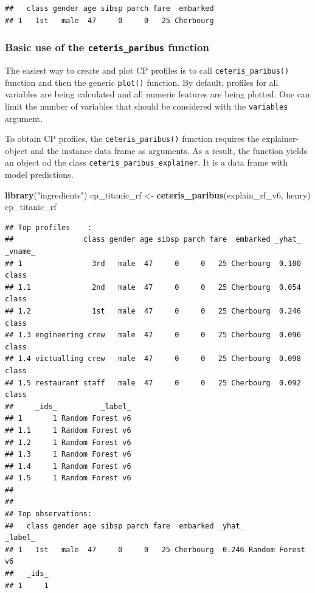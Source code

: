 \documentclass[12pt,]{krantz}
\newenvironment{Shaded}{\begin{snugshade}}{\end{snugshade}}
\newcommand{\KeywordTok}[1]{\textcolor[rgb]{0.13,0.29,0.53}{\textbf{#1}}}
\newcommand{\NormalTok}[1]{#1}
\newcommand{\StringTok}[1]{\textcolor[rgb]{0.31,0.60,0.02}{#1}}
\begin{document}
\begin{verbatim}
##   class gender age sibsp parch fare  embarked
## 1   1st   male  47     0     0   25 Cherbourg
\end{verbatim}

\hypertarget{basic-use-of-the-ceteris_paribus-function}{%
\subsubsection{\texorpdfstring{Basic use of the \texttt{ceteris\_paribus} function}{Basic use of the ceteris\_paribus function}}\label{basic-use-of-the-ceteris_paribus-function}}

The easiest way to create and plot CP profiles is to call \texttt{ceteris\_paribus()} function and then the generic \texttt{plot()} function. By default, profiles for all variables are being calculated and all numeric features are being plotted. One can limit the number of variables that should be considered with the \texttt{variables} argument.

To obtain CP profiles, the \texttt{ceteris\_paribus()} function requires the explainer-object and the instance data frame as arguments. As a result, the function yields an object od the class \texttt{ceteris\_paribus\_explainer}. It is a data frame with model predictions.

\begin{Shaded}
\begin{Highlighting}[]
\KeywordTok{library}\NormalTok{(}\StringTok{"ingredients"}\NormalTok{)}
\NormalTok{cp_titanic_rf <-}\StringTok{ }\KeywordTok{ceteris_paribus}\NormalTok{(explain_rf_v6, henry)}
\NormalTok{cp_titanic_rf}
\end{Highlighting}
\end{Shaded}

\begin{verbatim}
## Top profiles    : 
##                class gender age sibsp parch fare  embarked _yhat_ _vname_
## 1                3rd   male  47     0     0   25 Cherbourg  0.100   class
## 1.1              2nd   male  47     0     0   25 Cherbourg  0.054   class
## 1.2              1st   male  47     0     0   25 Cherbourg  0.246   class
## 1.3 engineering crew   male  47     0     0   25 Cherbourg  0.096   class
## 1.4 victualling crew   male  47     0     0   25 Cherbourg  0.098   class
## 1.5 restaurant staff   male  47     0     0   25 Cherbourg  0.092   class
##     _ids_          _label_
## 1       1 Random Forest v6
## 1.1     1 Random Forest v6
## 1.2     1 Random Forest v6
## 1.3     1 Random Forest v6
## 1.4     1 Random Forest v6
## 1.5     1 Random Forest v6
## 
## 
## Top observations:
##   class gender age sibsp parch fare  embarked _yhat_          _label_
## 1   1st   male  47     0     0   25 Cherbourg  0.246 Random Forest v6
##   _ids_
## 1     1
\end{verbatim}
\end{document}
